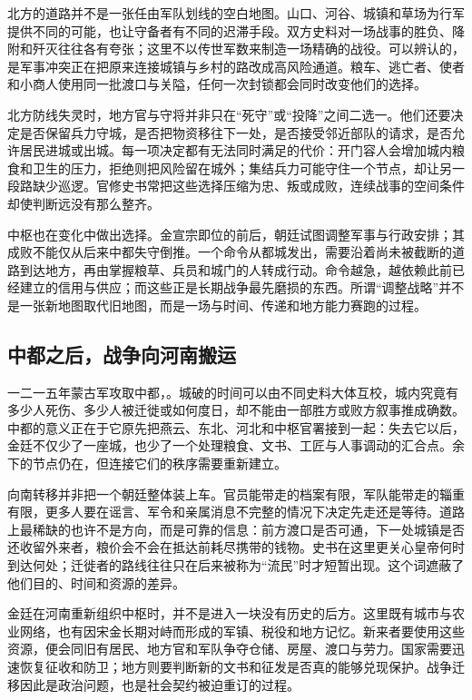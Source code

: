 北方的道路并不是一张任由军队划线的空白地图。山口、河谷、城镇和草场为行军提供不同的可能，也让守备者有不同的迟滞手段。双方史料对一场战事的胜负、降附和歼灭往往各有夸张；这里不以传世军数来制造一场精确的战役。可以辨认的，是军事冲突正在把原来连接城镇与乡村的路改成高风险通道。粮车、逃亡者、使者和小商人使用同一批渡口与关隘，任何一次封锁都会同时改变他们的选择。

北方防线失灵时，地方官与守将并非只在“死守”或“投降”之间二选一。他们还要决定是否保留兵力守城，是否把物资移往下一处，是否接受邻近部队的请求，是否允许居民进城或出城。每一项决定都有无法同时满足的代价：开门容人会增加城内粮食和卫生的压力，拒绝则把风险留在城外；集结兵力可能守住一个节点，却让另一段路缺少巡逻。官修史书常把这些选择压缩为忠、叛或成败，连续战事的空间条件却使判断远没有那么整齐。

中枢也在变化中做出选择。金宣宗即位的前后，朝廷试图调整军事与行政安排；其成败不能仅从后来中都失守倒推。一个命令从都城发出，需要沿着尚未被截断的道路到达地方，再由掌握粮草、兵员和城门的人转成行动。命令越急，越依赖此前已经建立的信用与供应；而这些正是长期战争最先磨损的东西。所谓“调整战略”并不是一张新地图取代旧地图，而是一场与时间、传递和地方能力赛跑的过程。

\subsection{中都之后，战争向河南搬运}

一二一五年蒙古军攻取中都，。城破的时间可以由不同史料大体互校，城内究竟有多少人死伤、多少人被迁徙或如何度日，却不能由一部胜方或败方叙事推成确数。中都的意义正在于它原先把燕云、东北、河北和中枢官署接到一起：失去它以后，金廷不仅少了一座城，也少了一个处理粮食、文书、工匠与人事调动的汇合点。余下的节点仍在，但连接它们的秩序需要重新建立。

向南转移并非把一个朝廷整体装上车。官员能带走的档案有限，军队能带走的辎重有限，更多人要在谣言、军令和亲属消息不完整的情况下决定先走还是等待。道路上最稀缺的也许不是方向，而是可靠的信息：前方渡口是否可通，下一处城镇是否还收留外来者，粮价会不会在抵达前耗尽携带的钱物。史书在这里更关心皇帝何时到达何处；迁徙者的路线往往只在后来被称为“流民”时才短暂出现。这个词遮蔽了他们目的、时间和资源的差异。

金廷在河南重新组织中枢时，并不是进入一块没有历史的后方。这里既有城市与农业网络，也有因宋金长期对峙而形成的军镇、税役和地方记忆。新来者要使用这些资源，便会同旧有居民、地方官和军队争夺仓储、房屋、渡口与劳力。国家需要迅速恢复征收和防卫；地方则要判断新的文书和征发是否真的能够兑现保护。战争迁移因此是政治问题，也是社会契约被迫重订的过程。

